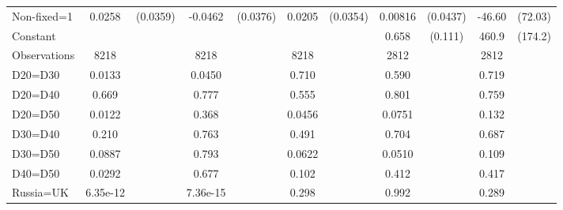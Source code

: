 \begin{tabular}{l|cccccc|cc|cc}
Non-fixed=1     &   0.0258         & (0.0359)&  -0.0462         & (0.0376)&   0.0205         & (0.0354)&  0.00816         & (0.0437)&   -46.60         &  (72.03)\\
Constant        &                  &         &                  &         &                  &         &    0.658\sym{***}&  (0.111)&    460.9\sym{***}&  (174.2)\\
\hline
Observations    &     8218         &         &     8218         &         &     8218         &         &     2812         &         &     2812         &         \\
D20=D30         &   0.0133         &         &   0.0450         &         &    0.710         &         &    0.590         &         &    0.719         &         \\
D20=D40         &    0.669         &         &    0.777         &         &    0.555         &         &    0.801         &         &    0.759         &         \\
D20=D50         &   0.0122         &         &    0.368         &         &   0.0456         &         &   0.0751         &         &    0.132         &         \\
D30=D40         &    0.210         &         &    0.763         &         &    0.491         &         &    0.704         &         &    0.687         &         \\
D30=D50         &   0.0887         &         &    0.793         &         &   0.0622         &         &   0.0510         &         &    0.109         &         \\
D40=D50         &   0.0292         &         &    0.677         &         &    0.102         &         &    0.412         &         &    0.417         &         \\
Russia=UK       & 6.35e-12         &         & 7.36e-15         &         &    0.298         &         &    0.992         &         &    0.289         &         \\
\hline\hline

\end{tabular}
